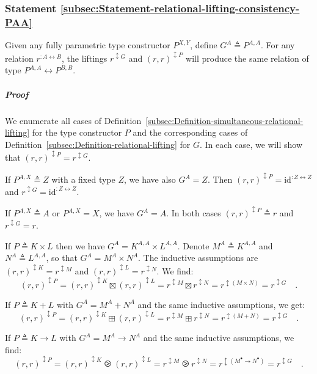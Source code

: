 \subsubsection{Statement \label{subsec:Statement-relational-lifting-consistency-PAA}\ref{subsec:Statement-relational-lifting-consistency-PAA}}

Given any fully parametric type constructor $P^{X,Y}$, define $G^{A}\triangleq P^{A,A}$.
For any relation $r^{:A\leftrightarrow B}$, the liftings $r^{\updownarrow G}$
and $\left(r,r\right)^{\updownarrow P}$ will produce the same relation
of type $P^{A,A}\leftrightarrow P^{B,B}$.

\subparagraph{Proof}

We enumerate all cases of Definition~\ref{subsec:Definition-simultaneous-relational-lifting}
for the type constructor $P$ and the corresponding cases of Definition~\ref{subsec:Definition-relational-lifting}
for $G$. In each case, we will show that $(r,r)^{\updownarrow P}=r^{\updownarrow G}$.

If $P^{A,X}\triangleq Z$ with a fixed type $Z$, we have also $G^{A}=Z$.
Then $(r,r)^{\updownarrow P}=\text{id}^{:Z\leftrightarrow Z}$ and
$r^{\updownarrow G}=\text{id}^{:Z\leftrightarrow Z}$.

If $P^{A,X}\triangleq A$ or $P^{A,X}=X$, we have $G^{A}=A$. In
both cases $(r,r)^{\updownarrow P}\triangleq r$ and $r^{\updownarrow G}=r$.

If $P\triangleq K\times L$ then we have $G^{A}=K^{A,A}\times L^{A,A}$.
Denote $M^{A}\triangleq K^{A,A}$ and $N^{A}\triangleq L^{A,A}$,
so that $G^{A}=M^{A}\times N^{A}$. The inductive assumptions are
$(r,r)^{\updownarrow K}=r^{\updownarrow M}$ and $(r,r)^{\updownarrow L}=r^{\updownarrow N}$.
We find:
\[
(r,r)^{\updownarrow P}=(r,r)^{\updownarrow K}\boxtimes(r,r)^{\updownarrow L}=r^{\updownarrow M}\boxtimes r^{\updownarrow N}=r^{\updownarrow(M\times N)}=r^{\updownarrow G}\quad.
\]

If $P\triangleq K+L$ with $G^{A}=M^{A}+N^{A}$ and the same inductive
assumptions, we get: 
\[
(r,r)^{\updownarrow P}=(r,r)^{\updownarrow K}\boxplus(r,r)^{\updownarrow L}=r^{\updownarrow M}\boxplus r^{\updownarrow N}=r^{\updownarrow(M+N)}=r^{\updownarrow G}\quad.
\]

If $P\triangleq K\rightarrow L$ with $G^{A}=M^{A}\rightarrow N^{A}$
and the same inductive assumptions, we find: 
\[
(r,r)^{\updownarrow P}=(r,r)^{\updownarrow K}\ogreaterthan(r,r)^{\updownarrow L}=r^{\updownarrow M}\ogreaterthan r^{\updownarrow N}=r^{\updownarrow(M^{\bullet}\rightarrow N^{\bullet})}=r^{\updownarrow G}\quad.
\]

